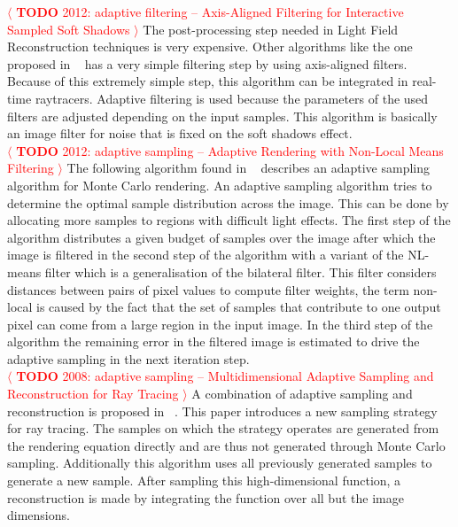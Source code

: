 \documentclass[review]{acmsiggraph}
\newcommand{\todo}[1]{\textcolor{red}{\(\langle\) \textbf{TODO} #1 \(\rangle\) }}
\begin{document}
\todo{2012: adaptive filtering -- Axis-Aligned Filtering for Interactive Sampled Soft Shadows}
The post-processing step needed in Light Field Reconstruction techniques is very expensive.
Other algorithms like the one proposed in ~\cite{UdayMehta:2012:AAF} has a very simple filtering step by using axis-aligned filters.
Because of this extremely simple step, this algorithm can be integrated in real-time raytracers.
Adaptive filtering is used because the parameters of the used filters are adjusted depending on the input samples.
This algorithm is basically an image filter for noise that is fixed on the soft shadows effect.
\\
\todo{2012: adaptive sampling -- Adaptive Rendering with Non-Local Means Filtering}
The following algorithm found in ~\cite{Rousselle:2012:ARN:2366145.2366214} describes an adaptive sampling algorithm for Monte Carlo rendering.
An adaptive sampling algorithm tries to determine the optimal sample distribution across the image.
This can be done by allocating more samples to regions with difficult light effects.
The first step of the algorithm distributes a given budget of samples over the image after which the image is filtered in the second step of the algorithm with a variant of the NL-means filter which is a generalisation of the bilateral filter.
This filter considers distances between pairs of pixel values to compute filter weights, the term non-local is caused by the fact that the set of samples that contribute to one output pixel can come from a large region in the input image.
In the third step of the algorithm the remaining error in the filtered image is estimated to drive the adaptive sampling in the next iteration step.
\\
\todo{2008: adaptive sampling -- Multidimensional Adaptive Sampling and Reconstruction for Ray Tracing}
A combination of adaptive sampling and reconstruction is proposed in ~\cite{Hachisuka:2008:MAS:1360612.1360632}.
This paper introduces a new sampling strategy for ray tracing.
The samples on which the strategy operates are generated from the rendering equation directly and are thus not generated through Monte Carlo sampling.
Additionally this algorithm uses all previously generated samples to generate a new sample.
After sampling this high-dimensional function, a reconstruction is made by integrating the function over all but the image dimensions.
\\
\end{document}
